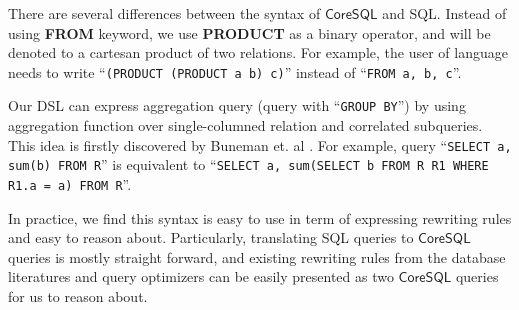 There are several differences between the syntax of $\mathsf{CoreSQL}$ and SQL. Instead of using \textbf{FROM} keyword, we use \textbf{PRODUCT} as a binary operator, and will be denoted to a cartesan product of two relations. For example, the user of language needs to write ``\lstinline[style=sql, keywords={}]{(PRODUCT (PRODUCT a b) c)}'' instead of ``\lstinline[style=sql, keywords={}]{FROM a, b, c}''.  

Our DSL can express aggregation query (query with ``\lstinline[style=sql, keywords={}]{GROUP BY}'') by
using aggregation function over single-columned relation and correlated subqueries. This idea is firstly discovered by Buneman et. al \cite{comp_syntax}. For example, query ``\lstinline[style=sql, keywords={}]{SELECT a, sum(b) FROM R}'' 
is equivalent to ``\lstinline[style=sql, keywords={}]{SELECT a, sum(SELECT b FROM R R1 WHERE R1.a = a) FROM R}''.


In practice, we find this syntax is easy to use in term of expressing 
rewriting rules and easy to reason about. Particularly, translating SQL queries to $\mathsf{CoreSQL}$ queries is mostly straight forward, and existing rewriting rules from the database 
literatures and query optimizers can be easily presented as two $\mathsf{CoreSQL}$ queries for us to reason about.

